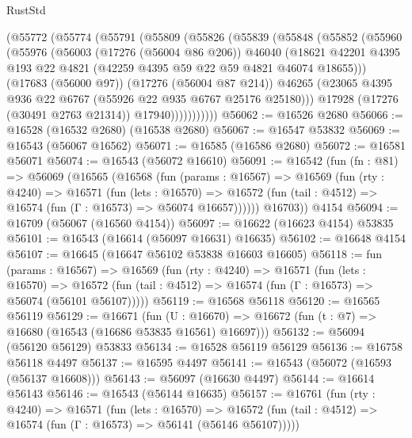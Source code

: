 \begin{lexlean}{RustStd}
\begin{coremodule}
        (@55772
          (@55774
            (@55791
              (@55809
                (@55826
                  (@55839
                    (@55848
                      (@55852
                        (@55960
                          (@55976
                            (@56003
                              (@17276 (@56004 @86 @206))
                              @46040
                              (@18621
                                @42201
                                @4395
                                @193
                                @22
                                @4821
                                (@42259 @4395 @59 @22 @59 @4821 @46074 @18655)))
                            (@17683 (@56000 @97))
                            (@17276 (@56004 @87 @214))
                            @46265
                            (@23065 @4395 @936 @22 @6767 (@55926 @22 @935 @6767 @25176 @25180)))
                          @17928
                          (@17276 (@30491 @2763 @21314))
                          @17940)))))))))))
@56062 := @16526 @2680
@56066 := @16528 (@16532 @2680) (@16538 @2680)
@56067 := @16547 @53832
@56069 := @16543 (@56067 @16562)
@56071 := @16585 (@16586 @2680)
@56072 := @16581 @56071
@56074 := @16543 (@56072 @16610)
@56091 := @16542
    (fun (fn : @81) =>
    @56069
      (@16565
        (@16568
          (fun (params : @16567) =>
          @16569
            (fun (rty : @4240) =>
            @16571
              (fun (lets : @16570) =>
              @16572 (fun (tail : @4512) => @16574 (fun (Γ : @16573) => @56074 @16657))))))
        @16703))
    @4154
@56094 := @16709 (@56067 (@16560 @4154))
@56097 := @16622 (@16623 @4154) @53835
@56101 := @16543 (@16614 (@56097 @16631) @16635)
@56102 := @16648 @4154
@56107 := @16645 (@16647 @56102 @53838 @16603 @16605)
@56118 := fun (params : @16567) =>
  @16569
    (fun (rty : @4240) =>
    @16571
      (fun (lets : @16570) =>
      @16572 (fun (tail : @4512) => @16574 (fun (Γ : @16573) => @56074 (@56101 @56107)))))
@56119 := @16568 @56118
@56120 := @16565 @56119
@56129 := @16671
    (fun (U : @16670) => @16672 (fun (t : @7) => @16680 (@16543 (@16686 @53835 @16561) @16697)))
@56132 := @56094 (@56120 @56129) @53833
@56134 := @16528 @56119 @56129
@56136 := @16758 @56118 @4497
@56137 := @16595 @4497
@56141 := @16543 (@56072 (@16593 (@56137 @16608)))
@56143 := @56097 (@16630 @4497)
@56144 := @16614 @56143
@56146 := @16543 (@56144 @16635)
@56157 := @16761
    (fun (rty : @4240) =>
    @16571
      (fun (lets : @16570) =>
      @16572 (fun (tail : @4512) => @16574 (fun (Γ : @16573) => @56141 (@56146 @56107)))))

\end{coremodule}
\end{lexlean}
